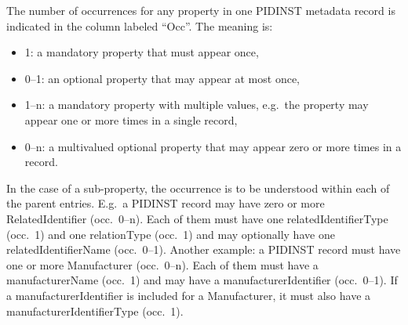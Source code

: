 \documentclass[titlepage=true,twoside=false,DIV=13]{scrartcl}
\begin{document}
The number of occurrences for any property in one PIDINST metadata
record is indicated in the column labeled ``Occ''.  The meaning is:
\begin{itemize}
\item 1: a mandatory property that must appear once,
\item 0--1: an optional property that may appear at most once,
\item 1--n: a mandatory property with multiple values, e.g.\ the
  property may appear one or more times in a single record,
\item 0--n: a multivalued optional property that may appear zero
  or more times in a record.
\end{itemize}
In the case of a sub-property, the occurrence is to be understood
within each of the parent entries.  E.g.\ a PIDINST record may have
zero or more RelatedIdentifier (occ.\ 0--n).  Each of them must have
one relatedIdentifierType (occ.\ 1) and one relationType (occ.\ 1) and
may optionally have one relatedIdentifierName (occ.\ 0--1).  Another
example: a PIDINST record must have one or more Manufacturer
(occ.\ 0--n).  Each of them must have a manufacturerName (occ.\ 1) and
may have a manufacturerIdentifier (occ.\ 0--1).  If a
manufacturerIdentifier is included for a Manufacturer, it must also
have a manufacturerIdentifierType (occ.\ 1).

\newlength{\idcolw}\settowidth{\idcolw}{5.3.1}
\newlength{\propcolw}\settowidth{\propcolw}{instrumentTypeIdentifierType}
\newlength{\occcolw}
\newlength{\valcolw}\settowidth{\valcolw}{Controlled list of values:}
\setlength{\defcolw}{\textwidth}
\addtolength{\defcolw}{-\idcolw}
\addtolength{\defcolw}{-\propcolw}
\addtolength{\defcolw}{-\occcolw}
\addtolength{\defcolw}{-\valcolw}
\addtolength{\defcolw}{-10\tabcolsep}
\end{document}
